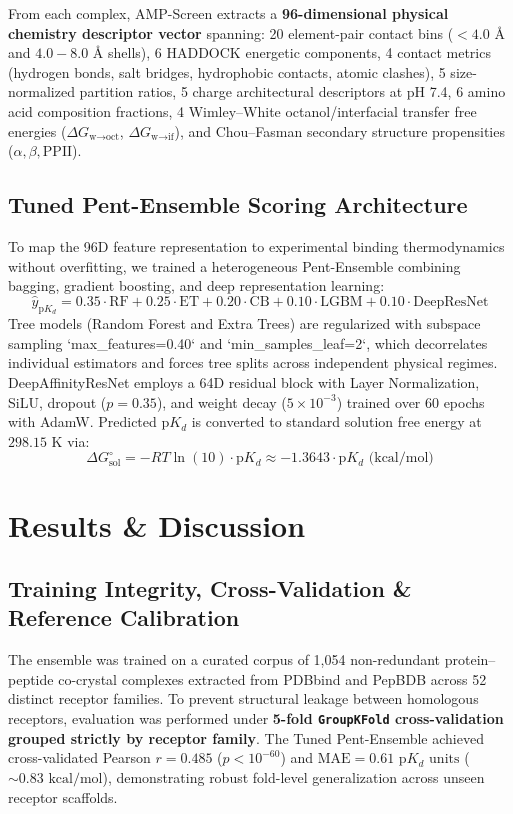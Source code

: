 \documentclass[10pt,twocolumn]{article}
\begin{document}
From each complex, AMP-Screen extracts a \textbf{96-dimensional physical chemistry descriptor vector} spanning: 20 element-pair contact bins ($<4.0\text{ \AA}$ and $4.0-8.0\text{ \AA}$ shells), 6 HADDOCK energetic components, 4 contact metrics (hydrogen bonds, salt bridges, hydrophobic contacts, atomic clashes), 5 size-normalized partition ratios, 5 charge architectural descriptors at pH 7.4, 6 amino acid composition fractions, 4 Wimley--White octanol/interfacial transfer free energies ($\Delta G_{\text{w}\to\text{oct}}$, $\Delta G_{\text{w}\to\text{if}}$), and Chou--Fasman secondary structure propensities ($\alpha, \beta, \text{PPII}$).

\subsection{Tuned Pent-Ensemble Scoring Architecture}
To map the 96D feature representation to experimental binding thermodynamics without overfitting, we trained a heterogeneous Pent-Ensemble combining bagging, gradient boosting, and deep representation learning:
\begin{equation}
\hat{y}_{\text{p}K_d} = 0.35 \cdot \text{RF} + 0.25 \cdot \text{ET} + 0.20 \cdot \text{CB} + 0.10 \cdot \text{LGBM} + 0.10 \cdot \text{DeepResNet}
\end{equation}
Tree models (Random Forest and Extra Trees) are regularized with subspace sampling `max\_features=0.40` and `min\_samples\_leaf=2`, which decorrelates individual estimators and forces tree splits across independent physical regimes. DeepAffinityResNet employs a 64D residual block with Layer Normalization, SiLU, dropout ($p=0.35$), and weight decay ($5 \times 10^{-3}$) trained over 60 epochs with AdamW. Predicted $\text{p}K_d$ is converted to standard solution free energy at $298.15\text{ K}$ via:
\begin{equation}
\Delta G_{\text{sol}}^\circ = -RT \ln(10) \cdot \text{p}K_d \approx -1.3643 \cdot \text{p}K_d\text{ (kcal/mol)}
\end{equation}

\section{Results \& Discussion}

\subsection{Training Integrity, Cross-Validation \& Reference Calibration}
The ensemble was trained on a curated corpus of 1,054 non-redundant protein--peptide co-crystal complexes extracted from PDBbind and PepBDB across 52 distinct receptor families. To prevent structural leakage between homologous receptors, evaluation was performed under \textbf{5-fold \texttt{GroupKFold} cross-validation grouped strictly by receptor family}. The Tuned Pent-Ensemble achieved cross-validated Pearson $r = 0.485$ ($p < 10^{-60}$) and $\text{MAE} = 0.61\text{ p}K_d\text{ units}$ ($\sim 0.83\text{ kcal/mol}$), demonstrating robust fold-level generalization across unseen receptor scaffolds.
\end{document}
